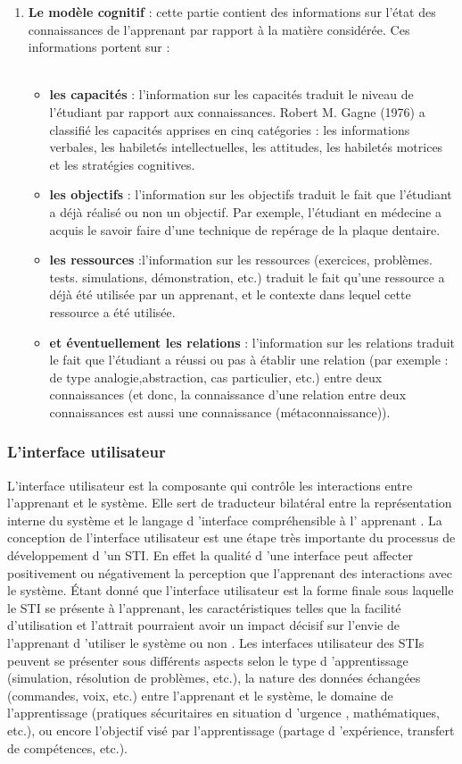 \begin{enumerate}
    \item \textbf{Le modèle cognitif} :  cette partie contient des informations sur l'état des connaissances de l'apprenant par rapport à la matière considérée. Ces informations portent sur : \\\
    \begin{itemize}
        \item \textbf{les capacités} : l'information sur les capacités traduit le niveau de l'étudiant par rapport aux connaissances. Robert M. Gagne (1976) a classifié les capacités apprises en cinq catégories : les informations verbales, les habiletés intellectuelles, les attitudes, les habiletés motrices et les stratégies cognitives.
        \item \textbf{les objectifs}  : l'information sur les objectifs traduit le fait que l'étudiant a déjà réalisé ou non un objectif. Par exemple, l'étudiant en médecine a acquis le savoir faire d'une technique de repérage de la plaque dentaire.
        \item \textbf{les ressources} :l'information sur les ressources (exercices, problèmes. tests. simulations, démonstration, etc.) traduit le fait qu'une ressource a déjà été utilisée par un apprenant, et le contexte dans lequel cette ressource a été utilisée.
        \item \textbf{et éventuellement les relations} : l'information sur les relations traduit le fait que l'étudiant a réussi ou pas à établir une relation (par exemple : de type analogie,abstraction, cas particulier, etc.) entre deux connaissances (et donc, la connaissance
d'une relation entre deux connaissances est aussi une connaissance (métaconnaissance)). 
    \end{itemize}
\end{enumerate}

 
\subsubsection{L'interface utilisateur}
L'interface utilisateur est la composante qui contrôle les interactions entre l'apprenant et le système. Elle sert de traducteur bilatéral entre la représentation interne du système et le langage d 'interface compréhensible à l' apprenant \cite{nwana}. La conception de l'interface utilisateur est une étape très importante du processus de développement d 'un STI. En effet la qualité d 'une interface peut affecter positivement ou négativement la perception que l'apprenant des interactions avec le système.  Étant donné que l'interface utilisateur est la forme finale sous laquelle le STI se présente à l'apprenant, les caractéristiques telles que la facilité d'utilisation et l'attrait pourraient avoir un impact décisif sur l'envie de l'apprenant d 'utiliser le système ou non \cite{nwana} .  Les interfaces utilisateur des STIs peuvent se présenter sous différents aspects selon le type d 'apprentissage (simulation, résolution de problèmes, etc.), la nature des données échangées (commandes, voix, etc.) entre l'apprenant et le système, le domaine de l'apprentissage (pratiques sécuritaires en situation d 'urgence , mathématiques, etc.), ou encore l'objectif visé par l'apprentissage (partage d 'expérience, transfert de compétences, etc.). 

